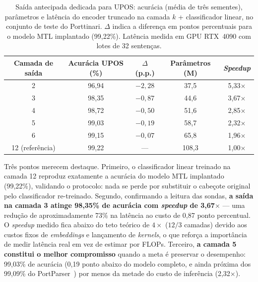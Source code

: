 \begin{table}[ht]
\centering
\caption{Saída antecipada dedicada para UPOS: acurácia (média de três sementes), parâmetros e
         latência do encoder truncado na camada $k$ + classificador linear, no conjunto de
         teste do Porttinari. $\Delta$ indica a diferença em pontos percentuais para o modelo
         MTL implantado (99,22\%). Latência medida em GPU RTX~4090 com lotes de 32 sentenças.}
\label{tab:early_exit_upos}
\begin{tabular}{ccccc}
\toprule
\textbf{Camada de saída} & \textbf{Acurácia UPOS (\%)} & \textbf{$\Delta$ (p.p.)} &
\textbf{Parâmetros (M)} & \textbf{\textit{Speedup}} \\
\midrule
2            & 96,94 & $-2{,}28$ & 37,5  & 5,33$\times$ \\
3            & 98,35 & $-0{,}87$ & 44,6  & 3,67$\times$ \\
4            & 98,72 & $-0{,}50$ & 51,6  & 2,85$\times$ \\
5            & 99,03 & $-0{,}19$ & 58,7  & 2,32$\times$ \\
6            & 99,15 & $-0{,}07$ & 65,8  & 1,96$\times$ \\
\midrule
12 (referência) & 99,22 & --- & 108,3 & 1,00$\times$ \\
\bottomrule
\end{tabular}
\end{table}

Três pontos merecem destaque. Primeiro, o classificador linear treinado na camada 12 reproduz
exatamente a acurácia do modelo MTL implantado (99,22\%), validando o protocolo: nada se perde
por substituir o cabeçote original pelo classificador re-treinado. Segundo, confirmando a
leitura das sondas, \textbf{a saída na camada 3 atinge 98,35\% de acurácia com
\textit{speedup} de 3,67$\times$} --- uma redução de aproximadamente 73\% na latência ao custo
de 0,87 ponto percentual. O \textit{speedup} medido fica abaixo do teto teórico de
$4\times$ ($12/3$ camadas) devido aos custos fixos de \textit{embeddings} e lançamento de
\textit{kernels}, o que reforça a importância de medir latência real em vez de estimar por
FLOPs. Terceiro, \textbf{a camada 5 constitui o melhor compromisso} quando a meta é preservar
o desempenho: 99,03\% de acurácia (0,19 ponto abaixo do modelo completo, e ainda próxima dos
99,09\% do PortParser~\citep{lopes2024towards}) por menos da metade do custo de inferência
(2,32$\times$).

